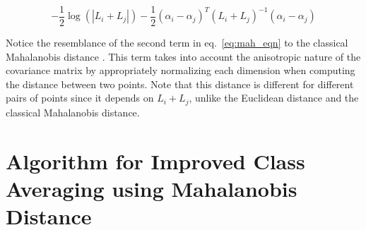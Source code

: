 \documentclass{article}
\begin{document}
\begin{equation}\label{eq:mah_eqn}
 -\frac{1}{2}\log(|L_i + L_j|) -\frac{1}{2}(\alpha_i - \alpha_j)^T(L_i+L_j)^{-1}(\alpha_i -\alpha_j)
\end{equation}

Notice the resemblance of the second term in eq.~\eqref{eq:mah_eqn} to the classical Mahalanobis distance \cite{mah}. This term takes into account the anisotropic nature of the covariance matrix by appropriately normalizing each dimension when computing the distance between two points. Note that this distance is different for different pairs of points since it depends on $L_i + L_j$, unlike the Euclidean distance and the classical Mahalanobis distance. 
\vspace{-.15in}
\section{Algorithm for Improved Class Averaging using Mahalanobis Distance}
\end{document}
